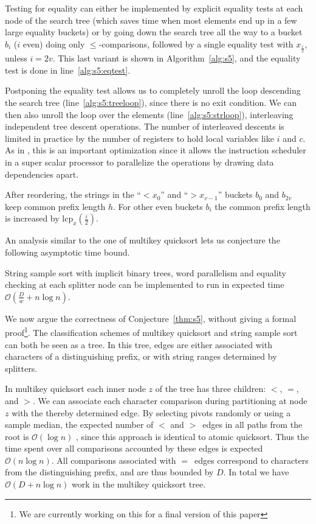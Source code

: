 \documentclass[a4paper]{myjournal}
\newcommand{\Oh}[1]{\mathcal{O}\!\left( #1\right)}
\newcommand{\lcp}{\mathrm{lcp}}
\def\Oh#1{\mathcal{O}(#1)}
\begin{document}
Testing for equality can either be implemented by explicit equality tests at
each node of the search tree (which saves time when most elements end up in a
few large equality buckets) or by going down the search tree all the way to a
bucket $b_i$ ($i$ even) doing only $\leq$-comparisons, followed by a single
equality test with $x_{\frac{i}{2}}$, unless $i = 2v$. This last variant is
shown in Algorithm~\ref{alg:s5}, and the equality test is done in
line~\ref{alg:s5:eqtest}.

Postponing the equality test allows us to completely unroll the loop descending
the search tree (line~\ref{alg:s5:treeloop}), since there is no exit
condition. We can then also unroll the loop over the elements
(line~\ref{alg:s5:strloop}), interleaving independent tree descent
operations. The number of interleaved descents is limited in practice by the
number of registers to hold local variables like $i$ and $c$. As in
\cite{sanders2004super}, this is an important optimization since it allows the
instruction scheduler in a super scalar processor to parallelize the operations
by drawing data dependencies apart.

After reordering, the strings in the ``$< x_0$'' and ``$> x_{v-1}$'' buckets
$b_0$ and $b_{2v}$ keep common prefix length $h$. For other even buckets
$b_i$ the common prefix length is increased by $\lcp_x(\frac{i}{2})$.

An analysis similar to the one of multikey quicksort \cite{bentley1997fast} lets
us conjecture the following asymptotic time bound.

\begin{conjecture}\label{thm:s5}
  String sample sort with implicit binary trees, word parallelism and equality
  checking at each splitter node can be implemented to run in expected time
  $\Oh{\frac{D}{w} + n \log n}$.
\end{conjecture}

We now argue the correctness of Conjecture~\ref{thm:s5}, without giving a formal
proof\footnote{We are currently working on this for a final version of this
  paper}.  The classification schemes of multikey quicksort and string sample
sort can both be seen as a tree. In this tree, edges are either associated with
characters of a distinguishing prefix, or with string ranges determined by
splitters.

In multikey quicksort each inner node $z$ of the tree has three children: $<$,
$=$, and $>$. We can associate each character comparison during partitioning at
node $z$ with the thereby determined edge.  By selecting pivots randomly or
using a sample median, the expected number of $<$ and $>$~edges in all paths
from the root is $\Oh{\log n}$ \cite{hoare1962quicksort,bentley1997fast}, since
this approach is identical to atomic quicksort. Thus the time spent over all
comparisons accounted by these edges is expected $\Oh{n \log n}$. All
comparisons associated with $=$~edges correspond to characters from the
distinguishing prefix, and are thus bounded by $D$. In total we have $\Oh{D + n
  \log n}$ work in the multikey quicksort tree.
\end{document}
